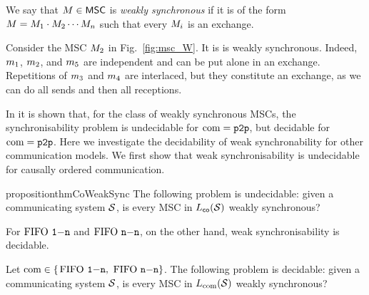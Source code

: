 \begin{definition}\label{def:weaksync-new}
	We say that $M \in \mathsf{MSC}$ is
	\emph{weakly synchronous} if it is of the form
	$M = M_1 \cdot M_2 \cdots M_n$
	such that every $M_i$ is an exchange.
\end{definition}

\begin{example}\label{example:msc_W}
	Consider the MSC $M_{2}$ in Fig.~\ref{fig:msc_W}. It is is weakly synchronous. Indeed, $m_1$, $m_2$, and $m_5$ are independent and can be put alone in an exchange. Repetitions of $m_3$ and $m_4$ are interlaced, but they constitute an exchange, as we can do all sends and then all receptions.
\end{example}

In \cite{BolligGFLLS21} it is shown that, for the class of weakly synchronous MSCs, 
the synchronisability problem is undecidable for $\textup{com} = \mathtt{p2p}$, but decidable for $\textup{com} = \mathtt{p2p}$.
Here we investigate the decidability of weak synchronability for other 
communication models. We first show that weak synchronisability 
is undecidable for causally ordered communication. 

\begin{restatable}{proposition}{thmCoWeakSync}
\label{thm:co-weaksync}
	The following problem is undecidable:
	given a communicating system $\mathcal{S}$,
	is every MSC in $L_{\mathsf{co}}(\mathcal{S})$ weakly synchronous?
\end{restatable}

For $\text{FIFO } \mathtt{1\mathsf{-}n}$ and $\text{FIFO } \mathtt{n\mathsf{-}n}$, on the other hand, weak synchronisability is decidable. 

\begin{proposition}\label{thm:weak-sync}
	Let $\textup{com} \in \{$$\text{FIFO } \mathtt{1\mathsf{-}n}, $ $\text{FIFO } \mathtt{n\mathsf{-}n}\}$.
	The following problem is decidable:
	given a communicating system $\mathcal{S}$,
	is every MSC in $L_{\textup{com}}(\mathcal{S})$ weakly synchronous?
\end{proposition}

